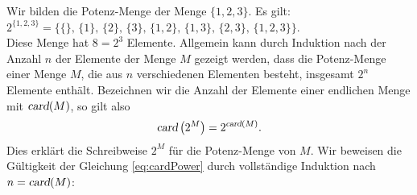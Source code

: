 \example
Wir bilden  die Potenz-Menge der Menge $\{1,2,3\}$.  Es gilt: \\[0.2cm]
\hspace*{1.3cm} $2^{\{1,2,3\}} = \big\{ \{\},\, \{1\}, \, \{2\},\, \{3\},\, \{1,2\}, \, \{1,3\}, \, \{2,3\},\, \{1,2,3\}\big\}$. \\[0.2cm]
Diese Menge hat $8 = 2^3$ Elemente.  Allgemein kann durch Induktion nach der Anzahl $n$ der
Elemente der Menge $M$ gezeigt werden, dass die 
Potenz-Menge einer Menge $M$, die aus $n$ verschiedenen Elementen besteht, insgesamt $2^n$ 
Elemente enthält.  Bezeichnen wir die Anzahl der Elemente einer endlichen Menge mit
$\textsl{card}(M)$, so gilt also
\begin{equation}
  \label{eq:cardPower}
\textsl{card}\left(2^M\right) = 2^{\textsl{card}(M)}.  
\end{equation}
Dies erklärt die Schreibweise $2^M$ für die Potenz-Menge von $M$.  Wir beweisen die
Gültigkeit der Gleichung \ref{eq:cardPower} durch vollständige Induktion nach $n =
\textsl{card}(M)$:
